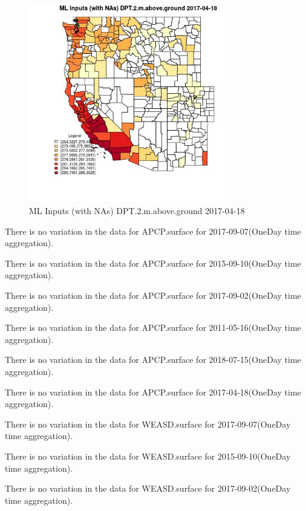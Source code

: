 \begin{figure} 
\centering  
\includegraphics[width=0.77\textwidth]{Code_Outputs/Report_ML_input_PM25_Step4_part_e_de_duplicated_aves_compiled_2019-05-21wNAs_CountyDPT2mabovegroundMean2017-04-18.jpg} 
\caption{\label{fig:Report_ML_input_PM25_Step4_part_e_de_duplicated_aves_compiled_2019-05-21wNAsCountyDPT2mabovegroundMean2017-04-18}ML Inputs (with NAs) DPT.2.m.above.ground 2017-04-18} 
\end{figure} 
 

There is no variation in the data for APCP.surface for 2017-09-07(OneDay time aggregation). 
 

There is no variation in the data for APCP.surface for 2015-09-10(OneDay time aggregation). 
 

There is no variation in the data for APCP.surface for 2017-09-02(OneDay time aggregation). 
 

There is no variation in the data for APCP.surface for 2011-05-16(OneDay time aggregation). 
 

There is no variation in the data for APCP.surface for 2018-07-15(OneDay time aggregation). 
 

There is no variation in the data for APCP.surface for 2017-04-18(OneDay time aggregation). 
 

There is no variation in the data for WEASD.surface for 2017-09-07(OneDay time aggregation). 
 

There is no variation in the data for WEASD.surface for 2015-09-10(OneDay time aggregation). 
 

There is no variation in the data for WEASD.surface for 2017-09-02(OneDay time aggregation). 
 

